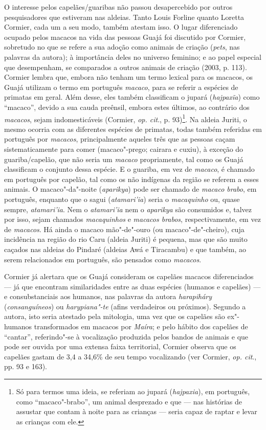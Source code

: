 O interesse pelos capelães/guaribas não passou desapercebido por outros
pesquisadores que estiveram nas aldeias. Tanto Louis Forline quanto
Loretta Cormier, cada um a seu modo, também atestam isso. O lugar
diferenciado ocupado pelos macacos na vida das pessoas Guajá foi
discutido por Cormier, sobretudo no que se refere a sua adoção como
animais de criação (\emph{pets}, nas palavras da autora); à importância
deles no universo feminino; e ao papel especial que desempenham, se
comparados a outros animais de criação (2003, p. 113). Cormier lembra
que, embora não tenham um termo lexical para os macacos, os Guajá
utilizam o termo em português \emph{macaco}, para se referir a espécies
de primatas em geral. Além desse, eles também classificam o jupará
(\emph{hajpaxĩa}) como ``macaco'', devido a sua cauda preênsil, embora
estes últimos, ao contrário dos \emph{macacos}, sejam indomesticáveis
(Cormier, \emph{op. cit}., p. 93)\footnote{Só para termos uma ideia, se
  referiam ao jupará (\emph{hajpaxia}), em português, como
  ``macaco"-brabo'', um animal desprezado e que --- nas histórias de assustar
  que contam à noite para as crianças --- seria capaz de raptar e levar as
  crianças com ele.}. Na aldeia Juriti, o mesmo ocorria com as
diferentes espécies de primatas, todas também referidas em português por
\emph{macacos}, principalmente aqueles três que as pessoas caçam
sistematicamente para comer (macaco"-prego; cairara e cuxiu), à exceção
do guariba/capelão, que não seria um \emph{macaco} propriamente, tal
como os Guajá classificam o conjunto dessa espécie. E o guariba, em vez
de \emph{macaco}, é chamado em português por capelão, tal como os não
indígenas da região se referem a esses animais. O macaco"-da"-noite
(\emph{aparikya}) pode ser chamado de \emph{macaco brabo}, em português,
enquanto que o sagui (\emph{atamari'ia}) seria o \emph{macaquinho} ou,
quase sempre, \emph{atamari'ia}. Nem o \emph{atamari'ia} nem o
\emph{aparikya} são consumidos e, talvez por isso, sejam chamados
\emph{macaquinhos} e \emph{macacos brabos}, respectivamente, em vez de
\emph{macacos}. Há ainda o macaco mão"-de"-ouro (ou macaco"-de"-cheiro),
cuja incidência na região do rio Caru (aldeia Juriti) é pequena, mas que
são muito caçados nas aldeias do Pindaré (aldeias Awá e Tiracambu) e que
também, ao serem relacionados em português, são pensados como
\emph{macacos}.

Cormier já alertara que os Guajá consideram os capelães macacos
diferenciados --- já que encontram similaridades entre as duas espécies
(humanos e capelães) --- e consubstanciais aos humanos, nas palavras da
autora \emph{harapiháry} (\emph{consanguíneos}) ou \emph{harypiana"-te}
(afins verdadeiros ou próximos). Segundo a autora, isto seria atestado
pela mitologia, uma vez que os capelães são ex"-humanos transformados em
macacos por \emph{Maíra}; e pelo hábito dos capelães de ``cantar'',
referindo"-se à vocalização produzida pelos bandos de animais e que pode
ser ouvida por uma extensa faixa territorial, Cormier observa que os
capelães gastam de 3,4 a 34,6\% de seu tempo vocalizando (ver Cormier,
\emph{op. cit}., pp. 93 e 163).

